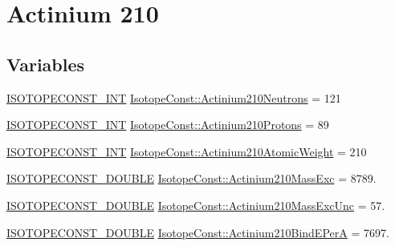 \hypertarget{group___isotope_const-_actinium-_ac210}{}\section{Actinium 210}
\label{group___isotope_const-_actinium-_ac210}
\subsection*{Variables}
\begin{DoxyCompactItemize}
\item 
\mbox{\hyperlink{group___isotope_const-_macros_ga5f18360b3e99483a35c32d789e62621c}{I\+S\+O\+T\+O\+P\+E\+C\+O\+N\+S\+T\+\_\+\+I\+NT}} \mbox{\hyperlink{group___isotope_const-_actinium-_ac210_ga8ed924694f679867b95a377253c86498}{Isotope\+Const\+::\+Actinium210\+Neutrons}} = 121
\item 
\mbox{\hyperlink{group___isotope_const-_macros_ga5f18360b3e99483a35c32d789e62621c}{I\+S\+O\+T\+O\+P\+E\+C\+O\+N\+S\+T\+\_\+\+I\+NT}} \mbox{\hyperlink{group___isotope_const-_actinium-_ac210_ga83ceba4b28404f4d64fb37d51c18ac34}{Isotope\+Const\+::\+Actinium210\+Protons}} = 89
\item 
\mbox{\hyperlink{group___isotope_const-_macros_ga5f18360b3e99483a35c32d789e62621c}{I\+S\+O\+T\+O\+P\+E\+C\+O\+N\+S\+T\+\_\+\+I\+NT}} \mbox{\hyperlink{group___isotope_const-_actinium-_ac210_ga23d0f0da03fd7d28b7c52b698dc4f3b2}{Isotope\+Const\+::\+Actinium210\+Atomic\+Weight}} = 210
\item 
\mbox{\hyperlink{group___isotope_const-_macros_ga8f45a7272ce02c0b4c65c44636ed719a}{I\+S\+O\+T\+O\+P\+E\+C\+O\+N\+S\+T\+\_\+\+D\+O\+U\+B\+LE}} \mbox{\hyperlink{group___isotope_const-_actinium-_ac210_ga7966d0984f0e9960518c5bbefd3096f5}{Isotope\+Const\+::\+Actinium210\+Mass\+Exc}} = 8789.
\item 
\mbox{\hyperlink{group___isotope_const-_macros_ga8f45a7272ce02c0b4c65c44636ed719a}{I\+S\+O\+T\+O\+P\+E\+C\+O\+N\+S\+T\+\_\+\+D\+O\+U\+B\+LE}} \mbox{\hyperlink{group___isotope_const-_actinium-_ac210_gab0100ddd4d70513c5f1b4a19ce8ef330}{Isotope\+Const\+::\+Actinium210\+Mass\+Exc\+Unc}} = 57.
\item 
\mbox{\hyperlink{group___isotope_const-_macros_ga8f45a7272ce02c0b4c65c44636ed719a}{I\+S\+O\+T\+O\+P\+E\+C\+O\+N\+S\+T\+\_\+\+D\+O\+U\+B\+LE}} \mbox{\hyperlink{group___isotope_const-_actinium-_ac210_ga50de9c5eda51060ca27243a2d8de9712}{Isotope\+Const\+::\+Actinium210\+Bind\+E\+PerA}} = 7697.
\item 

\end{DoxyCompactItemize}
